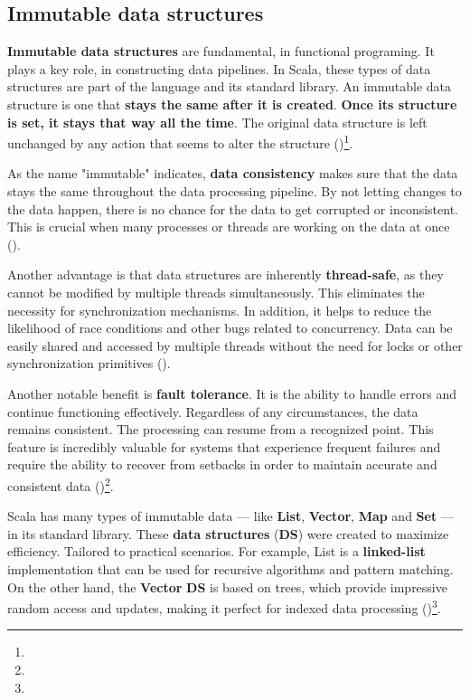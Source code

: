 \subsection{Immutable data structures}

\textbf{Immutable data structures} are fundamental, in functional programing. It plays a key role, in constructing data pipelines. In Scala, these types of data structures are part of the language and its standard library. An immutable data structure is one that \textbf{stays the same after it is created}. \textbf{Once its structure is set, it stays that way all the time}. The original data structure is left unchanged by any action that seems to alter the structure (\cite{zibinObjectReferenceImmutability2007})\footnote[7]{}.

As the name "immutable" indicates, \textbf{data consistency} makes sure that the data stays the same throughout the data processing pipeline. By not letting changes to the data happen, there is no chance for the data to get corrupted or inconsistent. This is crucial when many processes or threads are working on the data at once (\cite{milewskiFunctionalDataStructures2013})\footnotemark[8].

Another advantage is that data structures are inherently \textbf{thread-safe}, as they cannot be modified by multiple threads simultaneously. This eliminates the necessity for synchronization mechanisms. In addition, it helps to reduce the likelihood of race conditions and other bugs related to concurrency. Data can be easily shared and accessed by multiple threads without the need for locks or other synchronization primitives (\cite{milewskiFunctionalDataStructures2013})\footnotemark[8].

Another notable benefit is \textbf{fault tolerance}. It is the ability to handle errors and continue functioning effectively. Regardless of any circumstances, the data remains consistent. The processing can resume from a recognized point. This feature is incredibly valuable for systems that experience frequent failures and require the ability to recover from setbacks in order to maintain accurate and consistent data (\cite{milewskiFunctionalDataStructures2013})\footnote[8]{}.

Scala has many types of immutable data — like \textbf{List}, \textbf{Vector}, \textbf{Map} and \textbf{Set} — in its standard library. These\textbf{ data structures} (\textbf{DS}) were created to maximize efficiency. Tailored to practical scenarios. For example, List is a \textbf{linked-list} implementation that can be used for recursive algorithms and pattern matching. On the other hand, the \textbf{Vector} \textbf{DS} is based on trees, which provide impressive random access and updates, making it perfect for indexed data processing  (\cite{scalaVector})\footnote[9]{}.

